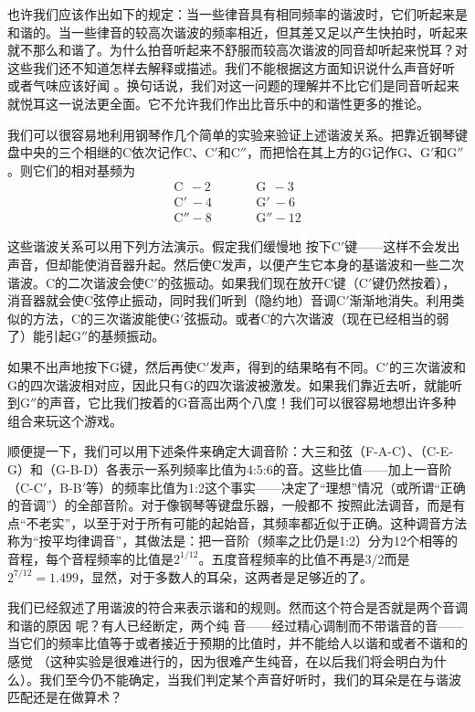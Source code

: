 也许我们应该作出如下的规定：当一些律音具有相同频率的谐波时，它们听起来是和谐的。当一些律音的较高次谐波的频率相近，但其差又足以产生快拍时，听起来就不那么和谐了。为什么拍音听起来不舒服而较高次谐波的同音却听起来悦耳？对这些我们还不知道怎样去解释或描述。我们不能根据这方面知识说什么声音好听 或者气味应该好闻 。换句话说，我们对这一问题的理解并不比它们是同音听起来就悦耳这一说法更全面。它不允许我们作出比音乐中的和谐性更多的推论。

我们可以很容易地利用钢琴作几个简单的实验来验证上述谐波关系。把靠近钢琴键盘中央的三个相继的C依次记作C、C$'$和C$''$，而把恰在其上方的G记作G、G$'$和G$''$。则它们的相对基频为
\begin{equation*}
    \begin{aligned}
        \text{C}~~-2& ~~~~~~~~~~~~ \text{G}~~-3\\
        \text{C}'~-4& ~~~~~~~~~~~~ \text{G}'~-6 \\
        \text{C}''-8& ~~~~~~~~~~~~ \text{G}''-12
    \end{aligned}
\end{equation*}

这些谐波关系可以用下列方法演示。假定我们缓慢地 按下C$'$键——这样不会发出声音，但却能使消音器升起。然后使C发声，以便产生它本身的基谐波和一些二次谐波。C的二次谐波会使C$'$的弦振动。如果我们现在放开C键（C$'$键仍然按着），消音器就会使C弦停止振动，同时我们听到（隐约地）音调C$'$渐渐地消失。利用类似的方法，C的三次谐波能使G$'$弦振动。或者C的六次谐波（现在已经相当的弱了）能引起G$''$的基频振动。

如果不出声地按下G键，然后再使C$'$发声，得到的结果略有不同。C$'$的三次谐波和G的四次谐波相对应，因此只有G的四次谐波被激发。如果我们靠近去听，就能听到G$''$的声音，它比我们按着的G音高出两个八度！我们可以很容易地想出许多种组合来玩这个游戏。

顺便提一下，我们可以用下述条件来确定大调音阶：大三和弦（F-A-C）、（C-E-G）和（G-B-D）各表示一系列频率比值为4:5:6的音。这些比值——加上一音阶（C-C$'$，B-B$'$等）的频率比值为1:2这个事实——决定了“理想”情况（或所谓“正确的音调”）的全部音阶。对于像钢琴等键盘乐器，一般都不 按照此法调音，而是有点“不老实”，以至于对于所有可能的起始音，其频率都近似于正确。这种调音方法称为“按平均律调音”，其做法是：把一音阶（频率之比仍是1:2）分为12个相等的音程，每个音程频率的比值是$2^{1/12}$。五度音程频率的比值不再是3/2而是$2^{7/12} =1.499$，显然，对于多数人的耳朵，这两者是足够近的了。

我们已经叙述了用谐波的符合来表示谐和的规则。然而这个符合是否就是两个音调和谐的原因 呢？有人已经断定，两个纯 音——经过精心调制而不带谐音的音——当它们的频率比值等于或者接近于预期的比值时，并不能给人以谐和或者不谐和的感觉 （这种实验是很难进行的，因为很难产生纯音，在以后我们将会明白为什么）。我们至今仍不能确定，当我们判定某个声音好听时，我们的耳朵是在与谐波匹配还是在做算术？

